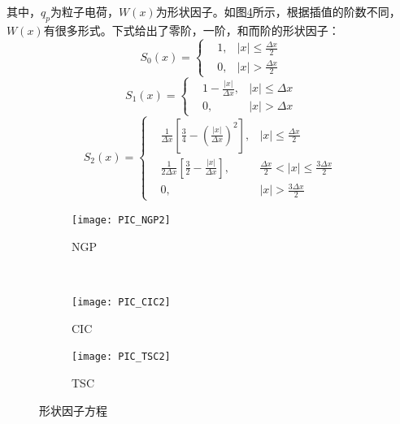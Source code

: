 {其中，$q_p$为粒子电荷，$W(x)$为形状因子。如图\ref{fig:PIC_weighting2}所示，根据插值的阶数不同，$W(x)$有很多形式。下式给出了零阶，一阶，和而阶的形状因子：
\begin{equation}\label{eq:NGP}
  S_0(x)=\left\{
  \begin{aligned}
  &1, &\left| x \right| \leqslant \frac{\Delta x}{2} \\
  &0, &\left| x \right| >         \frac{\Delta x}{2}
  \end{aligned}
  \right.
\end{equation}
\begin{equation}\label{eq:CIC}
  S_1(x)=\left\{
  \begin{aligned}
  &1-\frac{\left| x \right|}{\Delta x}, &\left| x \right| \leqslant \Delta x \\
  &0                                  , &\left| x \right| >         \Delta x
  \end{aligned}
  \right.
\end{equation}
\begin{equation}\label{eq:TSC}
  S_2(x)=\left\{
  \begin{aligned}
  &\frac{1}{ \Delta x} \left[\frac{3}{4}-(\frac{\left| x \right|}{\Delta x})^2 \right], &\left| x \right| \leqslant \frac{\Delta x}{2} \qquad \quad \\
  &\frac{1}{2\Delta x} \left[\frac{3}{2}- \frac{\left| x \right|}{\Delta x}    \right], &\frac{\Delta x}{2} < \left| x \right| \leqslant \frac{3\Delta x}{2} \\
  &0,                                                                                   &\left| x \right| > \frac{3\Delta x}{2}\qquad \ \
  \end{aligned}
  \right.
\end{equation}


\begin{figure}[!htbp]
  \centering
  \begin{subfigure}[b]{0.8\textwidth}
    \texttt{[image: PIC\_NGP2]}
    \caption{NGP}
    \label{fig:PIC_NGP2}
  \end{subfigure}%
  ~%
  \begin{subfigure}[b]{0.8\textwidth}
    \texttt{[image: PIC\_CIC2]}
    \caption{CIC}
    \label{fig:PIC_CIC2}
  \end{subfigure}
  \begin{subfigure}[b]{0.8\textwidth}
    \texttt{[image: PIC\_TSC2]}
    \caption{TSC}
    \label{fig:PIC_TSC2}
  \end{subfigure}%
  \caption{形状因子方程}
  \label{fig:PIC_weighting2}
\end{figure}

}
